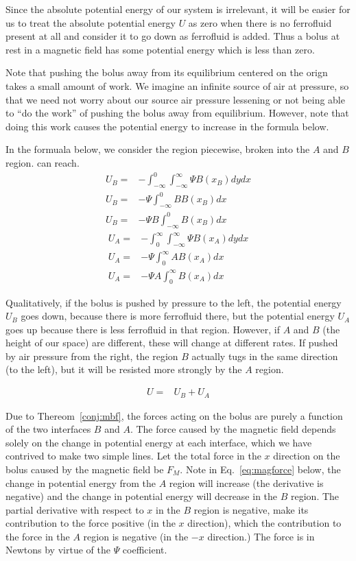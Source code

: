 \documentclass{asme2ej}
\begin{document}
Since the absolute potential energy of our system is irrelevant,
it will be easier for us to treat the absolute potential energy $U$
as zero when there is no ferrofluid present at all and consider it to go down as ferrofluid is added.
Thus a bolus at rest in a magnetic field has some potential energy which is
less than zero.

Note that pushing the bolus away from its equilibrium
centered on the orign takes a small amount of work.
We imagine an infinite source
of air at pressure, so that we need not worry
about our source air pressure lessening or not being able
to ``do the work'' of pushing the bolus away from equilibrium.
However, note that doing this work
causes the potential energy to increase in the formula below.


In the formuala below, we consider the region piecewise,
broken into the $A$ and $B$ region.
can reach.
\begin{align}
  U_B = & -\int_{-\infty}^0 \int_{-\infty}^{\infty}  \Psi B(x_B) dy dx \\
  U_B = & -\Psi\int_{-\infty}^0 B B(x_B)  dx  \\
  U_B = & - \Psi B \int_{-\infty}^0 B(x_B)  dx
\end{align}
\begin{align}
  U_A = & - \int_0^{\infty} \int_{-\infty}^{\infty} \Psi B(x_A) dy dx \\
  U_A = & - \Psi\int_0^{\infty} A B(x_A) dx \\
  U_A = & - \Psi A\int_0^{\infty} B(x_A) dx
\end{align}



Qualitatively, if the bolus is pushed by pressure to the left, the potential energy $U_B$
goes down, because there is more ferrofluid there, but the potential energy $U_A$ goes up
because there is less ferrofluid in that region. However, if $A$ and $B$ (the height of our space)
are different, these will change at different rates. If pushed by air pressure from the
right, the region $B$ actually tugs in the same direction (to the left), but it
will be resisted more strongly by the $A$ region.

\begin{align}
  U = & U_B + U_A
\end{align}


Due to Thereom~\ref{conj:mbf}, the forces acting on the bolus are purely a function
of the two interfaces $B$ and $A$.
The force caused by the magnetic field depends solely on the change in potential energy
at each interface, which we have contrived to make two simple lines.
Let the total force in the $x$ direction on the bolus caused by the magnetic
field be $F_M$. Note in Eq.~\ref{eq:magforce} below, the change in potential energy
from the $A$ region will increase (the derivative is negative) and
the change in potential energy will decrease in the $B$ region.
The partial derivative with respect to $x$ in the $B$ region is negative, make its contribution
to the force positive (in the $x$ direction), which the contribution to the force
in the $A$ region is negative (in the $-x$ direction.) The force is in Newtons by virtue
of the $\Psi$ coefficient.
\end{document}
